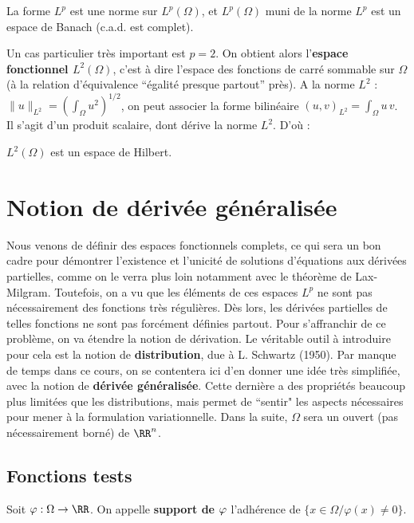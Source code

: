 %
\begin{theorem}
  La forme $L^p$ est une norme sur $L^p(\Omega)$, et $L^p(\Omega)$ muni de la
  norme $L^p$ est un espace de Banach (c.a.d. est complet).\label{thr:1}
\end{theorem}

%
Un cas particulier tr\`es important est $p=2$. On obtient alors \boldmath
l'{\bf espace fonctionnel $L^2(\Omega)$}, \unboldmath c'est \`a dire l'espace
des fonctions de carr\'e sommable sur $\Omega$ (\`a la relation
d'\'equivalence ``\'egalit\'e presque partout'' pr\`es). A la norme $L^2$ :
$\| u \|_{L^2} = \left( \int_\Omega u^2 \right)^{1/2} $, on peut associer la
forme bilin\'eaire $(u,v)_{L^2} = \int_\Omega u\, v$. Il s'agit d'un produit
scalaire, dont d\'erive la norme $L^2$. D'o\`u :
%
\begin{theorem}
  $L^2(\Omega)$ est un espace de Hilbert.\label{thr:2}
\end{theorem}

%
%
%
%
\section{Notion de d\'eriv\'ee g\'en\'eralis\'ee}
\label{sec:notion-de-derivee}
%
%
\noindent
Nous venons de d\'efinir des espaces fonctionnels complets, ce qui sera un bon
cadre pour d\'emontrer l'existence et l'unicit\'e de solutions d'\'equations
aux d\'eriv\'ees partielles, comme on le verra plus loin notamment avec le
th\'eor\`eme de Lax-Milgram. Toutefois, on a vu que les \'el\'ements de ces
espaces $L^p$ ne sont pas n\'ecessairement des fonctions tr\`es
r\'eguli\`eres. D\`es lors, les d\'eriv\'ees partielles de telles fonctions ne
sont pas forc\'ement d\'efinies partout. Pour s'affranchir de ce probl\`eme,
on va \'etendre la notion de d\'erivation.
%
Le v\'eritable outil \`a introduire pour cela est la notion de {\bf
distribution}, due \`a L. Schwartz (1950). Par manque de temps dans ce cours,
on se contentera ici d'en donner une id\'ee tr\`es simplifi\'ee, avec la
notion de {\bf d\'eriv\'ee g\'en\'eralis\'ee}.  Cette derni\`ere a des
propri\'et\'es beaucoup plus limit\'ees que les distributions, mais permet de
``sentir" les aspects n\'ecessaires pour mener \`a la formulation
variationnelle.
%
%
Dans la suite, $\Omega$ sera un ouvert (pas n\'ecessairement born\'e) de $\RR^n$.
%
%
\subsection{Fonctions tests}
\label{sec:fonctions-tests}
%
%
\noindent
\begin{definition}
  Soit $\varphi : \Omega \rightarrow \RR$. On appelle {\bf support de $\bf
  \varphi$} l'adh\'erence de $\{ x \in \Omega / \varphi(x) \ne 0 \}$.\label{def:10}
\end{definition}

